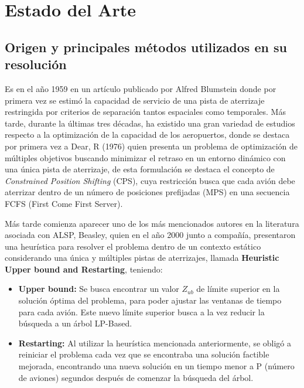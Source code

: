 \documentclass[letter, 10pt]{article}
\begin{document}
\newpage
\section{Estado del Arte}

\subsection{Origen y principales métodos utilizados en su resolución}

Es en el año 1959 en un artículo publicado por Alfred Blumstein \cite{Blumstein1959} donde por primera vez se estimó la capacidad de servicio de una pista de aterrizaje restringida por criterios de separación tantos espaciales como temporales. Más tarde, durante la últimas tres décadas, ha existido una gran variedad de estudios respecto a la optimización de la capacidad de los aeropuertos, donde se destaca por primera vez a Dear, R (1976)\cite{Dear1976} quien presenta un problema de optimización de múltiples objetivos buscando minimizar el retraso en un entorno dinámico con una única pista de aterrizaje, de esta formulación se destaca el concepto de \textit{Constrained Position Shifting} (CPS), cuya restricción busca que cada avión debe aterrizar dentro de un número de posiciones prefijadas (MPS) en una secuencia FCFS (First Come First Server).

Más tarde comienza aparecer uno de los más mencionados autores en la literatura asociada con ALSP, Beasley, quien en el año 2000 \cite{article1} junto a compañía, presentaron una heurística para resolver el problema dentro de un contexto estático considerando una única y múltiples pistas de aterrizajes, llamada \textbf{Heuristic Upper bound and Restarting}, teniendo:
\begin{itemize}
    \item \textbf{Upper bound:} Se busca encontrar un valor $Z_{ub}$ de límite superior en la solución óptima del problema, para poder ajustar las ventanas de tiempo para cada avión. Este nuevo límite superior busca a la vez reducir la búsqueda a un árbol LP-Based.
    \item \textbf{Restarting:} Al utilizar la heurística mencionada anteriormente, se obligó a reiniciar el problema cada vez que se encontraba una solución factible mejorada, encontrando una nueva solución en un tiempo menor a P (número de aviones) segundos después de comenzar la búsqueda del árbol.
\end{itemize}
\end{document}
